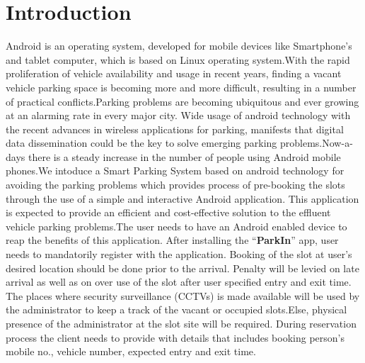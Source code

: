 \documentclass[12pt, english]{article}
\begin{document}
\section{Introduction}
Android is an operating system, developed for mobile devices like Smartphone’s and tablet computer, which is based on Linux operating system.With the rapid proliferation of vehicle availability and usage in recent years, finding a vacant vehicle parking space is becoming more and more difficult, resulting in a number of practical conflicts.Parking problems are becoming ubiquitous and ever growing at an alarming rate in every major city. Wide usage of android technology with the recent advances in wireless applications for parking, manifests that digital data dissemination could be the key to solve emerging parking problems.Now-a-days there is a steady increase in the number of people using Android mobile phones.We intoduce a Smart Parking System based on android technology for avoiding the parking problems which provides process of pre-booking the slots through the use of a simple and interactive Android application. This application is expected to provide an efficient and cost-effective solution to the effluent vehicle parking problems.The user needs to have an Android enabled device to reap the benefits of this application. After installing the “\textbf{ParkIn}”
app, user needs to mandatorily register with the application. Booking of the slot at user’s desired location should be done prior to the arrival.
Penalty will be levied on late arrival as well as on over use of the slot after user specified entry and exit time. The places where security surveillance (CCTVs) is made available will be used by the administrator to keep a track of the vacant or occupied slots.Else, physical presence of the administrator at the slot site will be required. During reservation process the client needs to provide with details that includes booking person’s mobile no., vehicle number, expected entry and exit time.
\end{document}
